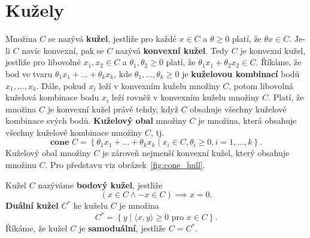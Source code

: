 \section{Kužely}

Množina $C$ se nazývá \textbf{kužel}, jestliže pro každé $x \in C$ a $\theta \geq 0$ platí, že $\theta x \in C$. Je-li $C$ navíc konvexní, pak se $C$ nazývá \textbf{konvexní kužel}. Tedy $C$ je konvexní kužel, jestliže pro libovolné $x_1, x_2 \in C$ a $\theta_1, \theta_2 \geq 0$ platí, že $\theta_1 x_1 + \theta_2 x_2 \in C$. Říkáme, že bod ve tvaru $\theta_1 x_1 + \dots + \theta_k x_k$, kde $\theta_1, \dots, \theta_k \geq 0$ je \textbf{kuželovou kombinací} bodů $x_1, \dots, x_k$. Dále, pokud $x_i$ leží v konvexním kuželu množiny $C$, potom libovolná kuželová kombinace bodu $x_i$ leží rovněž v konvexním kuželu množiny $C$. Platí, že množina $C$ je konvexní kužel právě tehdy, když $C$ obsahuje všechny kuželové kombinace svých bodů. \textbf{Kuželový obal} množiny $C$ je množina, která obsahuje všechny kuželové kombinace množiny $C$, tj.
$$
    \textbf{cone }C = \left\{ \theta_1 x_1 + \dots + \theta_k x_k \mid x_i \in C, \theta_i \geq 0, i = 1, \dots, k \right\}.
$$
Kuželový obal množiny $C$ je zároveň nejmenší konvexní kužel, který obsahuje množinu $C$. Pro představu viz obrázek~\ref{fig:cone_hull}.

Kužel $C$ nazýváme \textbf{bodový kužel}, jestliže
$$
    (x \in C \wedge -x \in C) \implies x = 0.
$$
\textbf{Duální kužel} $C^*$ ke kuželu $C$ je množina
$$
    C^* = \left\{ y \mid \langle x, y \rangle \geq 0 \text{ pro } x \in C \right\}.
$$
Říkáme, že kužel $C$ je \textbf{samoduální}, jestliže $C = C^*$.

